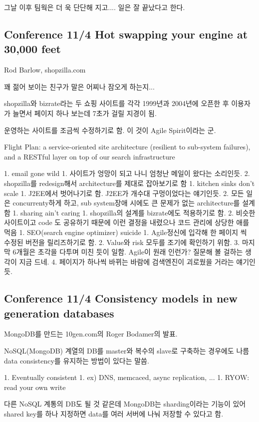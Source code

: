\documentclass[a4paper]{article}
\begin{document}
그날 이후 팀웍은 더 욱 단단해 지고.... 일은 잘 끝났다고 한다.
 
\subsection{Conference 11/4 Hot swapping your engine at 30,000 feet}
 
Rod Barlow, shopzilla.com
 
꽤 젊어 보이는 친구가 말은 어찌나 잠오게 하는지...
 
shopzilla와 bizrate라는 두 쇼핑 사이트를 각각 1999년과 2004년에 오픈한 후 이용자가 늘면서 페이지 하나 보는데 7초가 걸릴 지경이 됨.
 
운영하는 사이트를 조금씩 수정하기로 함. 이 것이 Agile Spirit이라는 군.
 
Flight Plan: a service-oriented site architecture (resilient to sub-system failures), and a RESTful layer on top of our search infrastructure
 
1. email gone wild
1. 사이트가 엉망이 되고 나니 엄청난 메일이 왔다는 소리인듯. 
2. shopzilla를 redesign해서 architecture를 제대로 잡아보기로 함
1. kitchen sinks don’t scale
1. J2EE에서 벗어나기로 함. J2EE가 개수대 구멍이었다는 얘기인듯.
2. 모든 일은 concurrenty하게 하고, sub system장애 시에도 큰 문제가 없는 architecture를 설계함
1. sharing ain’t caring
1. shopzilla의 설계를 bizrate에도 적용하기로 함.
2. 비슷한 사이트이고 code 도 공유하기 때문에 이런 결정을 내렸으나 코드 관리에 상당한 애를 먹음
1. SEO(search engine optimizer) suicide
1. Agile정신에 입각해 한 페이지 씩 수정된 버전을 릴리즈하기로 함.
2. Value와 risk 모두를 조기에 확인하기 위함.
3. 마지막 6개월은 초각을 다투며 미친 듯이 일함. Agile이 원래 인런가? 질문해 볼 걸하는 생각이 지금 드네.
4. 페이지가 하나씩 바뀌는 바람에  검색엔진이 괴로웠을 거라는 얘기인듯.
 
\subsection{Conference 11/4 Consistency models in new generation databases}
 
MongoDB를 만드는 10gen.com의 Roger Bodamer의 발표.
 
NoSQL(MongoDB) 계열의 DB를 master와 복수의 slave로 구축하는 경우에도 나름 data consistency를 유지하는 방법이 있다는 말씀.
 
1. Eventually consistent
1. ex) DNS, memcaced, async replication, ...
1. RYOW: read your own write
 
다른  NoSQL 계통의 DB도 될 것 같은데  MongoDB는 sharding이라는 기능이 있어 shared key를 하나 지정하면 data를 여러 서버에 나눠 저장할 수 있다고 함. 
 
\end{document}
